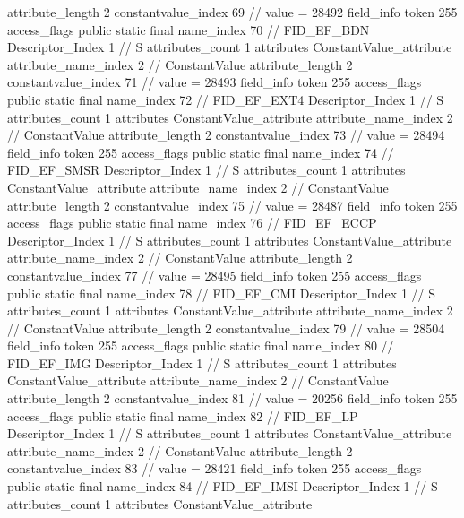{{{{{{{					attribute_length	2
					constantvalue_index	69		// value = 28492
				}
				}
			}
			field_info {
				token	255
				access_flags	public static final
				name_index	70		// FID_EF_BDN
				Descriptor_Index	1		// S
				attributes_count	1
				attributes {
				ConstantValue_attribute {
					attribute_name_index	2		// ConstantValue
					attribute_length	2
					constantvalue_index	71		// value = 28493
				}
				}
			}
			field_info {
				token	255
				access_flags	public static final
				name_index	72		// FID_EF_EXT4
				Descriptor_Index	1		// S
				attributes_count	1
				attributes {
				ConstantValue_attribute {
					attribute_name_index	2		// ConstantValue
					attribute_length	2
					constantvalue_index	73		// value = 28494
				}
				}
			}
			field_info {
				token	255
				access_flags	public static final
				name_index	74		// FID_EF_SMSR
				Descriptor_Index	1		// S
				attributes_count	1
				attributes {
				ConstantValue_attribute {
					attribute_name_index	2		// ConstantValue
					attribute_length	2
					constantvalue_index	75		// value = 28487
				}
				}
			}
			field_info {
				token	255
				access_flags	public static final
				name_index	76		// FID_EF_ECCP
				Descriptor_Index	1		// S
				attributes_count	1
				attributes {
				ConstantValue_attribute {
					attribute_name_index	2		// ConstantValue
					attribute_length	2
					constantvalue_index	77		// value = 28495
				}
				}
			}
			field_info {
				token	255
				access_flags	public static final
				name_index	78		// FID_EF_CMI
				Descriptor_Index	1		// S
				attributes_count	1
				attributes {
				ConstantValue_attribute {
					attribute_name_index	2		// ConstantValue
					attribute_length	2
					constantvalue_index	79		// value = 28504
				}
				}
			}
			field_info {
				token	255
				access_flags	public static final
				name_index	80		// FID_EF_IMG
				Descriptor_Index	1		// S
				attributes_count	1
				attributes {
				ConstantValue_attribute {
					attribute_name_index	2		// ConstantValue
					attribute_length	2
					constantvalue_index	81		// value = 20256
				}
				}
			}
			field_info {
				token	255
				access_flags	public static final
				name_index	82		// FID_EF_LP
				Descriptor_Index	1		// S
				attributes_count	1
				attributes {
				ConstantValue_attribute {
					attribute_name_index	2		// ConstantValue
					attribute_length	2
					constantvalue_index	83		// value = 28421
				}
				}
			}
			field_info {
				token	255
				access_flags	public static final
				name_index	84		// FID_EF_IMSI
				Descriptor_Index	1		// S
				attributes_count	1
				attributes {
				ConstantValue_attribute {
}}}}}}}
